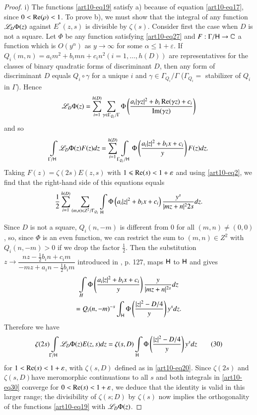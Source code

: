 \begin{proof}
i) The functions \eqref{art10-eq19} satisfy a) because of equation \eqref{art10-eq17}, since $0< \operatorname{Re} (\rho)<1$. To prove b), we must show that the integral of any function\pageoriginale $\mathscr{L}_D \Phi (z)$ against $E^\ast (z,s)$ is divisible by $\zeta(s)$. Consider first the case when $D$ is not a square. Let $\Phi$ be any function satisfying \eqref{art10-eq27} and $F : \Gamma / \mathsf{H} \to \mathbb{C}$ a function which is $O(y^\alpha)$ as $y \to \infty$ for some $\alpha \leqslant 1 + \varepsilon$. If $Q_i (m, n) = a_i m^2 + b_i mn + c_i n^2 (i = 1, \ldots, h (D))$ are representatives for the classes of binary quadratic forms of discriminant $D$, then any form of discriminant $D$ equals $Q_i \circ \gamma$ for a unique $i$ and $\gamma \in \Gamma_{Q_i} / \Gamma$ ($\Gamma_{Q_i} =$ stabilizer of $Q_i$ in $\Gamma$). Hence
$$
\mathscr{L}_D \Phi (z) = \sum\limits^{h(D)}_{i=1} \sum\limits_{\gamma \in \Gamma_{Q_i}/ \Gamma} \Phi \left(\frac{a_i |\gamma z|^2+ b_i \operatorname{Re} (\gamma z) + c_i}{\operatorname{Im} (\gamma z)} \right)
$$
and so 
$$
\int\limits_{\Gamma/\mathsf{H}} \mathscr{L}_D \Phi (z) F (z) dz = \sum\limits^{h(D)}_{i=1} \int\limits_{\Gamma_{Q_i}/ \mathsf{H}} \Phi \left(\frac{a_i |z|^2 + b_i x +c_i}{y} \right) F (z) dz.
$$ 
Taking $F(z) = \zeta(2s) E (z,s)$ with $1 \leqslant \operatorname{Re} (s) < 1 + \varepsilon$ and using \eqref{art10-eq2}, we find that the right-hand side of this equations equals
$$
\frac{1}{2} \sum\limits^{h(D)}_{i=1} \sum\limits_{(m,n) \in Z^2 / \Gamma_{Q_i}} \int\limits_{\mathsf{H}} \Phi \left(a_i |z|^2+ b_i x + c_i \right)  \frac{y^s}{|mz + n|^2{2s}} d z.
$$

Since $D$ is not a square, $Q_i (n, -m)$ is different from 0 for all $(m,n) \neq (0,0)$, so, since $\Phi$ is an even function, we can restrict the sum to $(m,n) \in Z^2$ with $Q_i (n, -m)>0$ if we drop the factor $\frac{1}{2}$. Then the substitution $z \to \dfrac{nz - \frac{1}{2} b_i n + c_i m}{-mz+ a_i n - \frac{1}{2} b_i m}$ introduced in \cite{art10-11}, p. 127, maps $\mathsf{H}$ to $\mathsf{H}$ and gives 
\begin{multline*}
\int\limits_H \Phi \left(\frac{a_i |z|^2 + b_i x + c_i}{y} \right) \frac{y}{|mz+ n|^{2s}} dz\\
=Q_i (n, -m)^{-s} \int_{\mathsf{H}} \Phi \left(\frac{|z|^2 -D/4}{y} \right) y^s dz. 
\end{multline*}
Therefore we have 
\begin{equation}
\zeta(2s) \int\limits_{\Gamma / \mathsf{H}} \mathscr{L}_D \Phi (z) E (z, s) dz = \zeta (s, D) \int\limits_{\mathsf{H}} \Phi \left(\frac{|z|^2- D /4}{y} \right) y^s dz \tag{30}  \label{art10-eq30}
\end{equation}
for $1 < \operatorname{Re} (s) <1 + \varepsilon$, with $\zeta (s,D)$ defined as in \eqref{art10-eq20}. Since $\zeta(2s)$ and $\zeta(s, D)$\pageoriginale have meromorphic continuations to all $s$ and both integrals in \eqref{art10-eq30} converge for $0< \operatorname{Re} (s) < 1+ \varepsilon$, we deduce that the identity is valid in this larger range; the divisibility of $\zeta (s; D)$ by $\zeta(s)$ now implies the orthogonality of the functions \eqref{art10-eq19} with $\mathscr{L}_D \Phi (z)$.


\end{proof}
